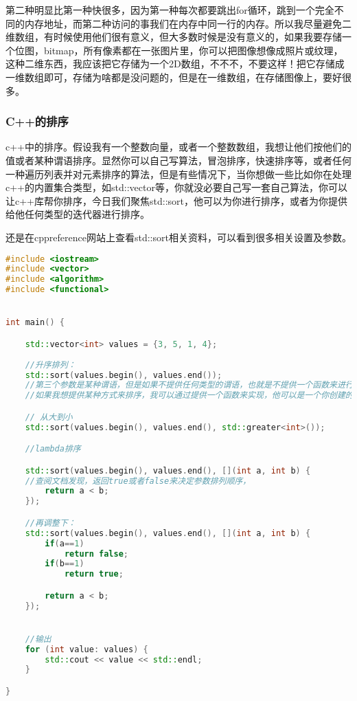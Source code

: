 第二种明显比第一种快很多，因为第一种每次都要跳出for循环，跳到一个完全不同的内存地址，而第二种访问的事我们在内存中同一行的内存。所以我尽量避免二维数组，有时候使用他们很有意义，但大多数时候是没有意义的，如果我要存储一个位图，bitmap，所有像素都在一张图片里，你可以把图像想像成照片或纹理，这种二维东西，我应该把它存储为一个2D数组，不不不，不要这样！把它存储成一维数组即可，存储为啥都是没问题的，但是在一维数组，在存储图像上，要好很多。



\subsubsection{C++的排序}


c++中的排序。假设我有一个整数向量，或者一个整数数组，我想让他们按他们的值或者某种谓语排序。显然你可以自己写算法，冒泡排序，快速排序等，或者任何一种遍历列表并对元素排序的算法，但是有些情况下，当你想做一些比如你在处理c++的内置集合类型，如{\ncodestyle std::vector}等，你就没必要自己写一套自己算法，你可以让c++库帮你排序，今日我们聚焦{\ncodestyle std::sort}，他可以为你进行排序，或者为你提供给他任何类型的迭代器进行排序。

还是在cppreference网站上查看{\ncodestyle std::sort}相关资料，可以看到很多相关设置及参数。

\begin{lstlisting}[language=c++]
#include <iostream>
#include <vector>
#include <algorithm>
#include <functional>


int main() {

    std::vector<int> values = {3, 5, 1, 4};
    
    //升序排列：
    std::sort(values.begin(), values.end());
    //第三个参数是某种谓语，但是如果不提供任何类型的谓语，也就是不提供一个函数来进行排序，对于整数他会按升序排列
    //如果我想提供某种方式来排序，我可以通过提供一个函数来实现，他可以是一个你创建的结构体内的函数，也可以是一个lambda，也可以是内置函数

    // 从大到小
    std::sort(values.begin(), values.end(), std::greater<int>());

    //lambda排序

    std::sort(values.begin(), values.end(), [](int a, int b) {
    //查阅文档发现，返回true或者false来决定参数排列顺序，
        return a < b;
    });

    //再调整下：
    std::sort(values.begin(), values.end(), [](int a, int b) {
        if(a==1)
            return false;
        if(b==1)
            return true;

        return a < b;
    });


    //输出
    for (int value: values) {
        std::cout << value << std::endl;
    }

}
\end{lstlisting}

